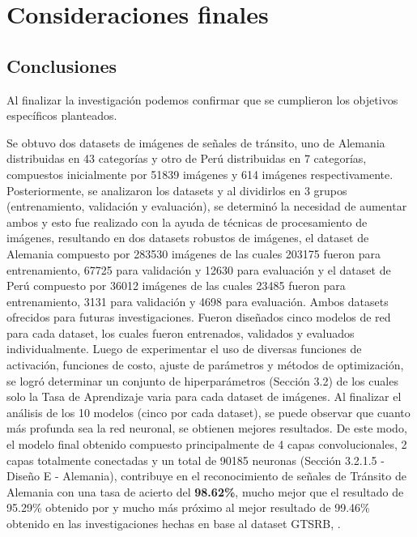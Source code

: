 \chapter{Consideraciones finales}
\setcounter{page}{128}
\renewcommand{\baselinestretch}{2} %
\textheight 21cm

\section{Conclusiones}

	Al finalizar la investigación podemos confirmar que se cumplieron los objetivos específicos planteados.

	Se obtuvo dos datasets de imágenes de señales de tránsito, uno de Alemania distribuidas en 43 categorías y otro de Perú distribuidas en 7 categorías, compuestos inicialmente por 51839 imágenes y 614 imágenes respectivamente.
\vskip 0.2cm
	Posteriormente, se analizaron los datasets y al dividirlos en 3 grupos (entrenamiento, validación y evaluación), se determinó la necesidad de aumentar ambos y esto fue realizado con la ayuda de técnicas de procesamiento de imágenes, resultando en dos datasets robustos de imágenes, el dataset de Alemania compuesto por 283530 imágenes de las cuales 203175 fueron para entrenamiento, 67725 para validación y 12630 para evaluación y el dataset de Perú compuesto por 36012 imágenes de las cuales 23485 fueron para entrenamiento, 3131 para validación y 4698 para evaluación. Ambos datasets ofrecidos para futuras investigaciones.
\vskip 0.2cm
	Fueron diseñados cinco modelos de red para cada dataset, los cuales fueron entrenados, validados y evaluados individualmente.
\vskip 0.2cm
	Luego de experimentar el uso de diversas funciones de activación, funciones de costo, ajuste de parámetros y métodos de optimización, se logró determinar un conjunto de hiperparámetros (Sección 3.2) de los cuales solo la Tasa de Aprendizaje varia para cada dataset de imágenes. 
	\vskip 0.2cm
	Al finalizar el análisis de los 10 modelos (cinco por cada dataset), se puede observar que cuanto más profunda sea la red neuronal, se obtienen mejores resultados. 
\vskip 0.2cm
	De este modo, el modelo final obtenido compuesto principalmente de 4 capas convolucionales, 2 capas totalmente conectadas y un total de 90185 neuronas (Sección 3.2.1.5 - Diseño E - Alemania), contribuye en el reconocimiento de señales de Tránsito de Alemania con una tasa de acierto del {\bf 98.62\%}, mucho mejor que el resultado de 95.29\% obtenido por \citep{Ayuque2016} y mucho más próximo al mejor resultado de 99.46\% obtenido en las investigaciones hechas en base al dataset GTSRB, \citep{Ciresan}.
	\vskip 0.2cm
	
